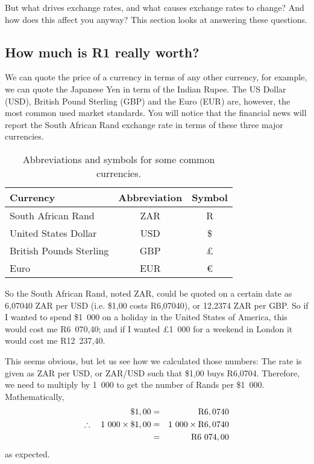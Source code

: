 \documentclass[10pt,a4paper,titlepage,twoside,openright]{report}
\begin{document}
But what drives exchange rates, and what causes exchange rates to change? And how does this affect you anyway? This section looks at answering these questions.

\subsection{How much is R1 really worth?}
We can quote the price of a currency in terms of any other currency, for example, we can quote the Japanese Yen in term of the Indian Rupee. The US Dollar (USD), British Pound Sterling (GBP) and the Euro (EUR) are, however, the most common used market standards. You will notice that the financial news will report the South African Rand exchange rate in terms of these three major currencies.

\begin{table}[htbp]
\begin{center}
\caption{Abbreviations and symbols for some common currencies.}
\begin{tabular}{|l|c|c|}\hline\hline
\textbf{Currency}&\textbf{Abbreviation}&\textbf{Symbol}\\\hline\hline
South African Rand & ZAR&R\\\hline
United States Dollar & USD&\$\\\hline
British Pounds Sterling & GBP&\pounds\\\hline
Euro & EUR&\euro\\\hline
\end{tabular}
\end{center}
\end{table}

So the South African Rand, noted ZAR,  could be quoted on a certain date as 6,07040 ZAR per USD (i.e. \$1,00 costs R6,07040), or 12,2374 ZAR per GBP. So if I wanted to spend \$1~000 on a holiday in the United States of America, this would cost me R6~070,40; and if I wanted \pounds 1~000 for a weekend in London it would cost me R12~237,40.

This seems obvious, but let us see how we calculated those numbers:
The rate is given as ZAR per USD, or ZAR/USD such that \$1,00 buys R6,0704. Therefore, we need to multiply by 1~000 to get the number of Rands per \$1~000.\\

Mathematically, 
\begin{eqnarray*}
\$ 1,00&=&\rm{R}6,0740\\
\therefore\quad 1~000 \times \$1,00&=&1~000 \times \rm{R}6,0740\\
&=&\rm{R}6~074,00
\end{eqnarray*}
as expected.\\
\end{document}
